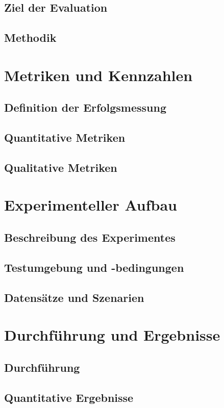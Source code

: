\documentclass[a4paper,10pt,twoside]{report}
\begin{document}
\subsection{Ziel der Evaluation}
\subsection{Methodik}

\section{Metriken und Kennzahlen}
\subsection{Definition der Erfolgsmessung}
\subsection{Quantitative Metriken}
\subsection{Qualitative Metriken}

\section{Experimenteller Aufbau}
\subsection{Beschreibung des Experimentes}
\subsection{Testumgebung und -bedingungen}
\subsection{Datensätze und Szenarien}

\section{Durchführung und Ergebnisse}
\subsection{Durchführung}
\subsection{Quantitative Ergebnisse}
\end{document}
